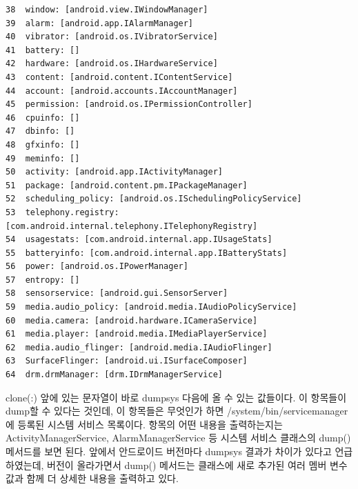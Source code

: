 \begin{lstlisting}[frame=single]
38	window: [android.view.IWindowManager]
39	alarm: [android.app.IAlarmManager]
40	vibrator: [android.os.IVibratorService]
41	battery: []
42	hardware: [android.os.IHardwareService]
43	content: [android.content.IContentService]
44	account: [android.accounts.IAccountManager]
45	permission: [android.os.IPermissionController]
46	cpuinfo: []
47	dbinfo: []
48	gfxinfo: []
49	meminfo: []
50	activity: [android.app.IActivityManager]
51	package: [android.content.pm.IPackageManager]
52	scheduling_policy: [android.os.ISchedulingPolicyService]
53	telephony.registry: [com.android.internal.telephony.ITelephonyRegistry]
54	usagestats: [com.android.internal.app.IUsageStats]
55	batteryinfo: [com.android.internal.app.IBatteryStats]
56	power: [android.os.IPowerManager]
57	entropy: []
58	sensorservice: [android.gui.SensorServer]
59	media.audio_policy: [android.media.IAudioPolicyService]
60	media.camera: [android.hardware.ICameraService]
61	media.player: [android.media.IMediaPlayerService]
62	media.audio_flinger: [android.media.IAudioFlinger]
63	SurfaceFlinger: [android.ui.ISurfaceComposer]
64	drm.drmManager: [drm.IDrmManagerService]
\end{lstlisting}

clone(:) 앞에 있는 문자열이 바로 dumpsys 다음에 올 수 있는 값들이다.
이 항목들이 dump할 수 있다는 것인데, 이 항목들은 무엇인가 하면 /system/bin/servicemanager에 등록된 시스템 서비스 목록이다.
항목의 어떤 내용을 출력하는지는 ActivityManagerService, AlarmManagerService 등 시스템 서비스 클래스의 dump() 메서드를 보면 된다. 앞에서 안드로이드 버전마다 dumpsys 결과가 차이가 있다고 언급하였는데, 버전이 올라가면서 dump() 메서드는 클래스에 새로 추가된 여러 멤버 변수값과 함께 더 상세한 내용을 출력하고 있다.\\


